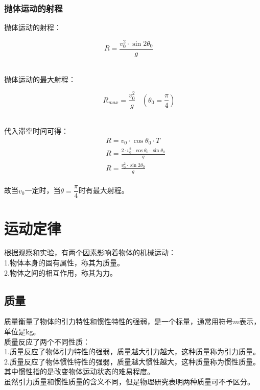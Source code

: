 \documentclass[UTF8]{ctexart}
\begin{document}
\subsubsection{抛体运动的射程}
    \setcounter{equation}{0}
    抛体运动的射程：
    \begin{large}
        \begin{equation*}
            R=\frac{v_0^2\cdot\sin{2\theta_0}}{g}~~~~~
        \end{equation*}
    \end{large}\\
    抛体运动的最大射程：
    \begin{large}
        \begin{equation*}
            ~~~~~~~~R_{max}=\frac{v_0^2}{g}~~~~\left(\theta_0=\frac{\pi}{4}\right)
        \end{equation*}
    \end{large}\\
    代入滞空时间可得：
    \begin{align}
        &R=v_0\cdot\cos{\theta_0}\cdot T\\[4mm]
        &R=\frac{2\cdot v_0^2\cdot\cos{\theta_0}\cdot\sin{\theta_0}}{g}\\[4mm]
        &R=\frac{v_0^2\cdot\sin{2\theta_0}}{g}
    \end{align}\\
    故当$v_0$一定时，当$\theta=\dfrac{\pi}{4}$时有最大射程。

\newpage

\section{运动定律}
    根据观察和实验，有两个因素影响着物体的机械运动：\\[3mm]
    1.物体本身的固有属性，称其为质量。\\[3mm]
    2.物体之间的相互作用，称其为力。

\subsection{质量}
    质量衡量了物体的引力特性和惯性特性的强弱，是一个标量，通常用符号$m$表示，单位是\si{kg}。\\[3mm]
    质量反应了两个不同性质：\\[3mm]
    1.质量反应了物体引力特性的强弱，质量越大引力越大，这种质量称为引力质量。\\[3mm]
    2.质量反应了物体惯性特性的强弱，质量越大惯性越大，这种质量称为惯性质量。\\[3mm]
    其中惯性指的是改变物体运动状态的难易程度。\\[3mm]
    虽然引力质量和惯性质量的含义不同，但是物理研究表明两种质量可不予区分。
\end{document}
